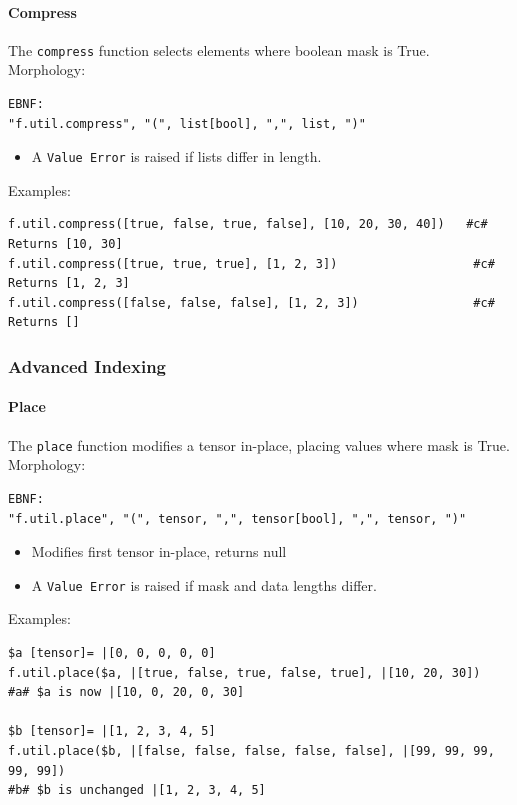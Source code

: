 \paragraph{Compress}
The \texttt{compress} function selects elements where boolean mask is True.\\
Morphology:
\begin{verbatim}
EBNF:
"f.util.compress", "(", list[bool], ",", list, ")"
\end{verbatim}
\begin{itemize}
\item A \texttt{Value Error} is raised if lists differ in length.
\end{itemize}
Examples:
\begin{verbatim}
f.util.compress([true, false, true, false], [10, 20, 30, 40])   #c# Returns [10, 30]
f.util.compress([true, true, true], [1, 2, 3])                   #c# Returns [1, 2, 3]
f.util.compress([false, false, false], [1, 2, 3])                #c# Returns []
\end{verbatim}

\subsubsection{Advanced Indexing}

\paragraph{Place}
The \texttt{place} function modifies a tensor in-place, placing values where mask is True.\\
Morphology:
\begin{verbatim}
EBNF:
"f.util.place", "(", tensor, ",", tensor[bool], ",", tensor, ")"
\end{verbatim}
\begin{itemize}
\item Modifies first tensor in-place, returns null
\item A \texttt{Value Error} is raised if mask and data lengths differ.
\end{itemize}
Examples:
\begin{verbatim}
$a [tensor]= |[0, 0, 0, 0, 0]
f.util.place($a, |[true, false, true, false, true], |[10, 20, 30])
#a# $a is now |[10, 0, 20, 0, 30]

$b [tensor]= |[1, 2, 3, 4, 5]
f.util.place($b, |[false, false, false, false, false], |[99, 99, 99, 99, 99])
#b# $b is unchanged |[1, 2, 3, 4, 5]
\end{verbatim}

